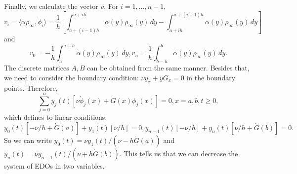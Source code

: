 \documentclass[12pt]{article}
\newcommand{\steady}{\rho_{\infty}}
\newcommand{\inner}[2]{\langle{} #1, #2 \rangle{}}
\theoremstyle{definition}
\begin{document}
Finally, we calculate the vector $v$.
For $i=1,\dots,n-1$,
\[
v_i = \inner{\dot\alpha \steady}{\dot{\phi}_i} = \frac{1}{h}\left[\int_{a+(i-1)h}^{a+ih} \dot\alpha(y) \steady(y)  \, dy- \int_{a+ih}^{a+(i+1)h} \dot\alpha(y) \steady(y) \, dy \right]    
\]
and 
\[
v_0 = -\frac{1}{h} \int_a^{a+h} \dot\alpha(y) \steady(y)  \, dy, v_n = \frac{1}{h} \int_{b-h}^{b} \dot\alpha(y) \steady(y)  \, dy.
\]
The discrete matrices $A, B$ can be obtained from the same manner. 
Besides that, we need to consider the boundary condition: $\nu y_x + y G_x = 0$ in the boundary points.
Therefore, 
\[
\sum_{j=0}^{n} y_j(t) \left[\nu\dot\phi_j(x) + \dot{G}(x) \phi_j(x)\right] = 0, x=a,b, t \ge 0, 
\]
which defines to linear conditions, 
\[
y_0(t) \left[-\nu/h + \dot{G}(a)\right] + y_1(t) \left[\nu/h\right] = 0, y_{n-1}(t) \left[-\nu/h\right] + y_n(t) \left[\nu/h + \dot{G}(b)\right] = 0.
\]
So we can write $y_0(t) = \nu y_1(t)/(\nu-h\dot{G}(a))$ and $y_n(t) = \nu y_{n-1}(t) / (\nu + h\dot{G}(b))$.
This tells us that we can decrease the system of EDOs in two variables. 




\end{document}

